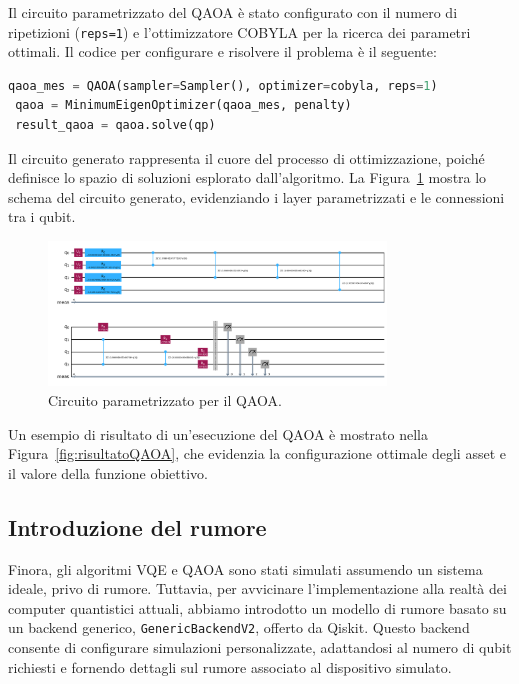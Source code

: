 Il circuito parametrizzato del QAOA è stato configurato con il numero di ripetizioni 
(\texttt{reps=1}) e l'ottimizzatore COBYLA per la ricerca dei parametri ottimali. 
Il codice per configurare e risolvere il problema è il seguente:

\begin{lstlisting}[language=python]
 qaoa_mes = QAOA(sampler=Sampler(), optimizer=cobyla, reps=1)
 qaoa = MinimumEigenOptimizer(qaoa_mes, penalty)
 result_qaoa = qaoa.solve(qp)
\end{lstlisting}

Il circuito generato rappresenta il cuore del processo di ottimizzazione, poiché 
definisce lo spazio di soluzioni esplorato dall'algoritmo. 
La Figura~\ref{fig:qaoa_circuit} mostra lo schema del circuito generato, evidenziando 
i layer parametrizzati e le connessioni tra i qubit.

\begin{figure}[h!]
    \centering
    \includegraphics[width=0.8\textwidth]{images/circuitoQAOA.png}
    \caption{Circuito parametrizzato per il QAOA.}
    \label{fig:qaoa_circuit}
\end{figure}

Un esempio di risultato di un'esecuzione del QAOA è mostrato nella 
Figura~\ref{fig:risultatoQAOA}, che evidenzia la configurazione ottimale degli asset 
e il valore della funzione obiettivo.



\subsection{Introduzione del rumore}

Finora, gli algoritmi VQE e QAOA sono stati simulati assumendo un sistema ideale, 
privo di rumore. Tuttavia, per avvicinare l'implementazione alla realtà dei computer 
quantistici attuali, abbiamo introdotto un modello di rumore basato su un backend 
generico, \texttt{GenericBackendV2}, offerto da Qiskit. Questo backend consente 
di configurare simulazioni personalizzate, adattandosi al numero di qubit richiesti 
e fornendo dettagli sul rumore associato al dispositivo simulato.

